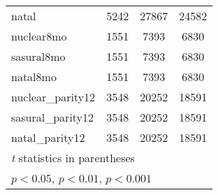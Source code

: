 {\begin{tabular}{l*{3}{c}}
natal       &        5242         &       27867         &       24582         \\
nuclear8mo  &        1551         &        7393         &        6830         \\
sasural8mo  &        1551         &        7393         &        6830         \\
natal8mo    &        1551         &        7393         &        6830         \\
nuclear\_parity12&        3548         &       20252         &       18591         \\
sasural\_parity12&        3548         &       20252         &       18591         \\
natal\_parity12&        3548         &       20252         &       18591         \\
\bottomrule
\multicolumn{4}{l}{\footnotesize \textit{t} statistics in parentheses}\\
\multicolumn{4}{l}{\footnotesize \sym{*} \(p<0.05\), \sym{**} \(p<0.01\), \sym{***} \(p<0.001\)}\\
\end{tabular}
}
